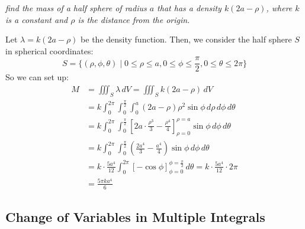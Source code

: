 \documentclass[11pt]{report}
\begin{document}
\begin{example}
    \textit{find the mass of a half sphere of radius $a$ that has a density $ k(2a - \rho)$, where $k$ is a constant and $\rho$ is the distance from the origin.}

    Let $\lambda = k(2a - \rho)$ be the density function. Then, we consider the half sphere $S$ in spherical coordinates:
    $$       
    S = \{(\rho, \phi, \theta) \mid 0 \le \rho \le a, 0 \le \phi \le \frac{\pi}{2}, 0 \le \theta \le 2\pi\}
    $$
    So we can set up:
    \begin{align*}
        M &= \iiint_S \lambda \, dV = \iiint_S k(2a - \rho) \, dV \\
        &= k \int_0^{2\pi} \int_0^{\frac{\pi}{2}} \int_0^a (2a - \rho) \rho^2 \sin \phi \, d\rho \, d\phi \, d\theta \\
        &= k \int_0^{2\pi} \int_0^{\frac{\pi}{2}} \left[ 2a \cdot \frac{\rho^3}{3} - \frac{\rho^4}{4} \right]_{\rho=0}^{\rho=a} \sin \phi \, d\phi \, d\theta \\
        &= k \int_0^{2\pi} \int_0^{\frac{\pi}{2}} \left( \frac{2a^4}{3} - \frac{a^4}{4} \right) \sin \phi \, d\phi \, d\theta \\
        &= k \cdot \frac{5a^4}{12} \int_0^{2\pi} \left[ -\cos \phi \right]_{\phi=0}^{\phi=\frac{\pi}{2}} \, d\theta = k \cdot \frac{5a^4}{12} \cdot 2\pi \\ 
        &= \frac{5\pi k a^4}{6}
    \end{align*}

\end{example}
\subsection{Change of Variables in Multiple Integrals} \label{sec:change_of_variables}
\end{document}
